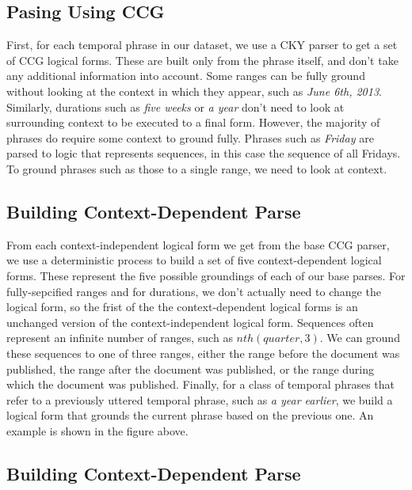 \subsection{Pasing Using CCG}
First, for each temporal phrase in our dataset, we use a CKY parser to get a set of CCG logical forms. These are built only from the phrase itself, and don't take any additional information into account. Some ranges can be fully ground without looking at the context in which they appear, such as \emph{June 6th, 2013}. Similarly, durations such as \emph{five weeks} or \emph{a year} don't need to look at surrounding context to be executed to a final form. However, the majority of phrases do require some context to ground fully. Phrases such as \emph{Friday} are parsed to logic that represents sequences, in this case the sequence of all Fridays. To ground phrases such as those to a single range, we need to look at context. 
\subsection{Building Context-Dependent Parse}
From each context-independent logical form we get from the base CCG parser, we use a deterministic process to build a set of five context-dependent logical forms. These represent the five possible groundings of each of our base parses. For fully-sepcified ranges and for durations, we don't actually need to change the logical form, so the frist of the the context-dependent logical forms is an unchanged version of the context-independent logical form. Sequences often represent an infinite number of ranges, such as $nth(quarter,3)$. We can ground these sequences to one of three ranges, either the range before the document was published, the range after the document was published, or the range during which the document was published. Finally, for a class of temporal phrases that refer to a previously uttered temporal phrase, such as \emph{a year earlier}, we build a logical form that grounds the current phrase based on the previous one. An example is shown in the figure above.

\subsection{Building Context-Dependent Parse}














